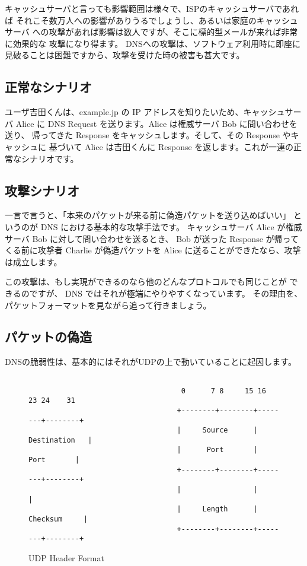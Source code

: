 キャッシュサーバと言っても影響範囲は様々で、ISPのキャッシュサーバであれば
それこそ数万人への影響がありうるでしょうし、あるいは家庭のキャッシュサーバ
への攻撃があれば影響は数人ですが、そこに標的型メールが来れば非常に効果的な
攻撃になり得ます。
DNSへの攻撃は、ソフトウェア利用時に即座に見破ることは困難ですから、攻撃を受けた時の被害も甚大です。

\subsection{正常なシナリオ}
ユーザ吉田くんは、example.jp の IP アドレスを知りたいため、キャッシュサーバ
Alice に DNS Request を送ります。Alice は権威サーバ Bob に問い合わせを送り、
帰ってきた Response をキャッシュします。そして、その Response やキャッシュに
基づいて Alice は吉田くんに Response を返します。これが一連の正常なシナリオです。

\subsection{攻撃シナリオ}
一言で言うと、「本来のパケットが来る前に偽造パケットを送り込めばいい」
というのが DNS における基本的な攻撃手法です。
キャッシュサーバ Alice が権威サーバ Bob に対して問い合わせを送るとき、
Bob が送った Response が帰ってくる前に攻撃者 Charlie が偽造パケットを
Alice に送ることができたなら、攻撃は成立します。

この攻撃は、もし実現ができるのなら他のどんなプロトコルでも同じことが
できるのですが、 DNS ではそれが極端にやりやすくなっています。
その理由を、パケットフォーマットを見ながら追って行きましょう。

\subsection{パケットの偽造}
DNSの脆弱性は、基本的にはそれがUDPの上で動いていることに起因します。

\begin{figure}[hbt]
{\scriptsize
\begin{verbatim}
                                    
                                    0      7 8     15 16    23 24    31  
                                   +--------+--------+--------+--------+ 
                                   |     Source      |   Destination   | 
                                   |      Port       |      Port       | 
                                   +--------+--------+--------+--------+ 
                                   |                 |                 | 
                                   |     Length      |    Checksum     | 
                                   +--------+--------+--------+--------+ 
\end{verbatim}
}
\caption{UDP Header Format}
\label{UDPHeader}
\end{figure}

